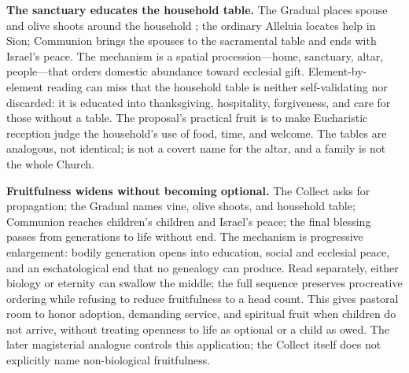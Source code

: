 \noindent\textbf{The sanctuary educates the household table.\enspace{}}
The Gradual places spouse and olive shoots around the household ; the ordinary Alleluia locates help in Sion; Communion brings the spouses to the sacramental table and ends with Israel's peace. The mechanism is a spatial procession---home, sanctuary, altar, people---that orders domestic abundance toward ecclesial gift. Element-by-element reading can miss that the household table is neither self-validating nor discarded: it is educated into thanksgiving, hospitality, forgiveness, and care for those without a table. The proposal's practical fruit is to make Eucharistic reception judge the household's use of food, time, and welcome. The tables are analogous, not identical;  is not a covert name for the altar, and a family is not the whole Church.

\noindent\textbf{Fruitfulness widens without becoming optional.\enspace{}}
The Collect asks for propagation; the Gradual names vine, olive shoots, and household table; Communion reaches children's children and Israel's peace; the final blessing passes from generations to life without end. The mechanism is progressive enlargement: bodily generation opens into education, social and ecclesial peace, and an eschatological end that no genealogy can produce. Read separately, either biology or eternity can swallow the middle; the full sequence preserves procreative ordering while refusing to reduce fruitfulness to a head count. This gives pastoral room to honor adoption, demanding service, and spiritual fruit when children do not arrive, without treating openness to life as optional or a child as owed. The later magisterial analogue controls this application; the Collect itself does not explicitly name non-biological fruitfulness.

\begingroup
\renewcommand{\sacramentSummaryKicker}{{\footnotesize\bfseries Sacramental Appendix\enspace---\enspace}}
